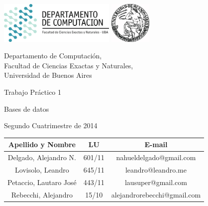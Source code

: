 \documentclass[a4paper, 10pt, twoside]{article}
\newcommand{\titulo}{Trabajo Práctico 1}
\newcommand{\materia}{Bases de datos}
\newcommand{\cuatrimestre}{Segundo Cuatrimestre de 2014}
\begin{document}


\thispagestyle{caratula}

\begin{center}

\includegraphics[height=2cm]{DC.png} 
\hfill
\includegraphics[height=2cm]{UBA.jpg} 

\vspace{2cm}

Departamento de Computación,\\
Facultad de Ciencias Exactas y Naturales,\\
Universidad de Buenos Aires

\vspace{4cm}

\begin{Huge}
\titulo
\end{Huge}

\vspace{0.5cm}

\begin{Large}
\materia
\end{Large}

\vspace{1cm}

\cuatrimestre

\vspace{4cm}

\begin{tabular}{|c|c|c|}
\hline
Apellido y Nombre & LU & E-mail\\
\hline
Delgado, Alejandro N.  & 601/11 & nahueldelgado@gmail.com\\
Lovisolo, Leandro      & 645/11 & leandro@leandro.me\\
Petaccio, Lautaro José & 443/11 & lausuper@gmail.com\\
Rebecchi, Alejandro & 15/10 & alejandrorebecchi@gmail.com\\
\hline
\end{tabular}

\end{center}
\end{document}
